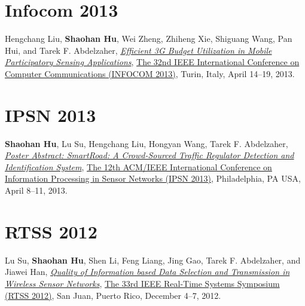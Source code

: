
\section{\sc Infocom 2013}\hypertarget{liu2013infocom}{}
Hengchang Liu, \textbf{Shaohan Hu}, Wei Zheng, Zhiheng Xie, Shiguang Wang, Pan Hui, and Tarek F. Abdelzaher,
\href{http://ieeexplore.ieee.org/xpl/articleDetails.jsp?arnumber=6566935}{\emph{Efficient 3G Budget Utilization in Mobile Participatory Sensing Applications}},
\href{http://infocom2013.ieee-infocom.org/}{\textsf{The 32nd IEEE International Conference on Computer Communications (INFOCOM 2013)}},
Turin, Italy, April 14--19, 2013.

\section{\sc IPSN 2013}\hypertarget{hu2013ipsn}{}
\textbf{Shaohan Hu}, Lu Su, Hengchang Liu, Hongyan Wang, Tarek F. Abdelzaher,
\href{http://portal.acm.org/citation.cfm?id=2461433}{\emph{Poster Abstract: SmartRoad: A Crowd-Sourced Traffic Regulator Detection and Identification System}},
\href{http://ipsn.acm.org/2013/}{\textsf{The 12th ACM/IEEE International Conference on Information Processing in Sensor Networks (IPSN 2013)}},
Philadelphia, PA USA, April 8--11, 2013.


\section{\sc RTSS 2012}\hypertarget{su2012rtss}{}
Lu Su, \textbf{Shaohan Hu}, Shen Li, Feng Liang, Jing Gao, Tarek F. Abdelzaher, and Jiawei Han,
\href{http://ieeexplore.ieee.org/xpl/articleDetails.jsp?arnumber=6424815}{\emph{Quality of Information based Data Selection and Transmission in Wireless Sensor Networks}},
\href{http://sites.ieee.org/rtss2012/}{\textsf{The 33rd IEEE Real-Time Systems Symposium (RTSS 2012)}},
San Juan, Puerto Rico, December 4--7, 2012.

